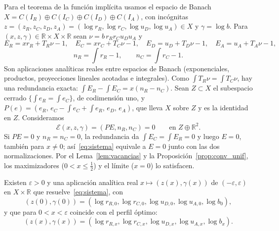 Para el teorema de la función implícita usamos el espacio de Banach
$X=C(I_R)\oplus C(I_C)\oplus C(I_D)\oplus C(I_A)$, con incógnitas
$z=(z_R,z_C,z_D,z_A)=(\log r_R,\log r_C,\log u_D,\log u_A)\in X$ y $\gamma=\log b$. Para
$(x,z,\gamma)\in\mathbb R\times X\times\mathbb R$ sean $\nu=b\,r_Rr_Cu_Du_A$ y
\[
 E_R=xr_R+T_R\nu-1,\quad E_C=xr_C+T_C\nu-1,\quad E_D=u_D+T_D\nu-1,\quad E_A=u_A+T_A\nu-1,
\]
\[
 n_R=\int r_R-1,\qquad n_C=\int r_C-1 .
\]
Son aplicaciones analíticas reales entre espacios de Banach (exponenciales, productos, proyecciones
lineales acotadas e integrales). Como $\int T_R\nu=\int T_C\nu$, hay una redundancia exacta:
$\int E_R-\int E_C=x(n_R-n_C)$. Sean $Z\subset X$ el subespacio cerrado $\{\int e_R=\int e_C\}$, de
codimensión uno, y $P(e)=(e_R,\,e_C-\int e_C+\int e_R,\,e_D,\,e_A)$, que lleva $X$ sobre $Z$ y es la
identidad en $Z$. Consideramos
\begin{equation}\label{eq:sistema}
 \mathscr E(x,z,\gamma)=(PE,n_R,n_C)=0\qquad\text{en }Z\oplus\mathbb R^2 .
\end{equation}
Si $PE=0$ y $n_R=n_C=0$, la redundancia da $\int E_C=\int E_R=0$ y luego $E=0$, también para
$x\ne0$; así~\eqref{eq:sistema} equivale a $E=0$ junto con las dos normalizaciones. Por el
Lema~\ref{lem:vacancias} y la Proposición~\ref{prop:conv_unif}, los maximizadores ($0<x\le\frac12$) y
el límite ($x=0$) lo satisfacen.

\begin{teorema}\label{thm:rama}
Existen $\varepsilon>0$ y una aplicación analítica real $x\mapsto(z(x),\gamma(x))$ de
$(-\varepsilon,\varepsilon)$ en $X\times\mathbb R$ que resuelve~\eqref{eq:sistema}, con
\[
 (z(0),\gamma(0))=(\log r_{R,0},\log r_{C,0},\log u_{D,0},\log u_{A,0},\log b_0),
\]
y que para $0<x<\varepsilon$ coincide con el perfil óptimo:
\[
 (z(x),\gamma(x))=(\log r_{R,x},\log r_{C,x},\log u_{D,x},\log u_{A,x},\log b_x).
\]
\end{teorema}

